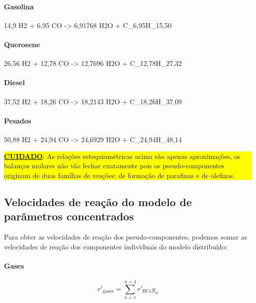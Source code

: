\documentclass[portuguese,12pt,a4paper,onecolumn]{article}
\begin{document}
	\paragraph{Gasolina}
	\begin{reaction}
		14,9 H2 + 6,95 CO -> 6,91768 H2O + C_{6,95}H_{15,50}
	\end{reaction}
	
	\paragraph{Querosene}
	\begin{reaction}
		26,56 H2 + 12,78 CO -> 12,7696 H2O + C_{12,78}H_{27,32}
		\label{reac:querosene}
	\end{reaction}
	
	\paragraph{Diesel}
	\begin{reaction}
		37,52 H2 + 18,26 CO -> 18,2143 H2O + C_{18,26}H_{37,09} 
	\end{reaction}
	
	\paragraph{Pesados}
	\begin{reaction}
		50,88 H2 + 24,94 CO -> 24,6929 H2O + C_{24,94}H_{48,14}
		\label{reac:pesados_2}
	\end{reaction}
	
	\colorbox{yellow}{\parbox{\textwidth}{
			\textbf{\underline{CUIDADO}}: As relações estequiométricas acima são apenas aproximações, os balanços molares não vão fechar exatamente pois os pseudo-componentes originam de duas famílias de reações: de formação de parafinas e de olefinas.
	}}
	
	\subsection{Velocidades de reação do modelo de parâmetros concentrados}
	
	Para obter as velocidades de reação dos pseudo-componentes, podemos somar as velocidades de reação dos componentes individuais do modelo distribuído:
	
	\paragraph{Gases}
	\begin{equation}
		r'_\mathrm{gases} = \sum_{n=1}^{n=4} r'_\mathrm{ HCs } y_n
	\end{equation}
	
\end{document}
